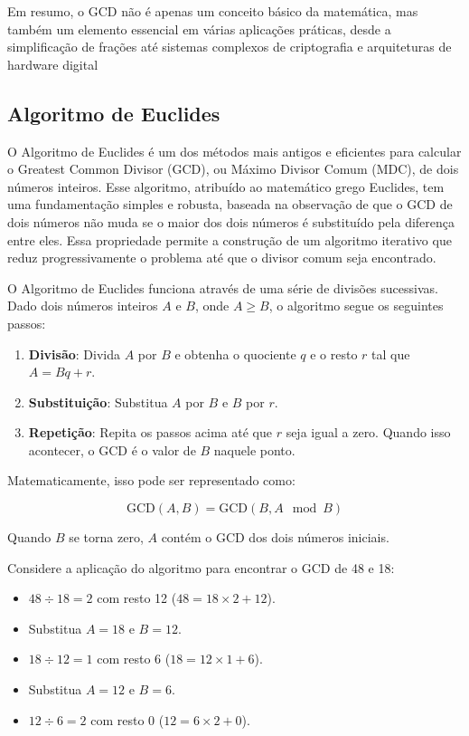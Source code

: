 \documentclass[a4paper,11pt]{article} %
\begin{document}
Em resumo, o GCD não é apenas um conceito básico da matemática, mas também um elemento essencial em várias aplicações práticas, desde a simplificação de frações até sistemas complexos de criptografia e arquiteturas de hardware digital

\subsection{Algoritmo de Euclides}
O Algoritmo de Euclides é um dos métodos mais antigos e eficientes para calcular o Greatest Common Divisor (GCD), ou Máximo Divisor Comum (MDC), de dois números inteiros. Esse algoritmo, atribuído ao matemático grego Euclides, tem uma fundamentação simples e robusta, baseada na observação de que o GCD de dois números não muda se o maior dos dois números é substituído pela diferença entre eles. Essa propriedade permite a construção de um algoritmo iterativo que reduz progressivamente o problema até que o divisor comum seja encontrado.

O Algoritmo de Euclides funciona através de uma série de divisões sucessivas. Dado dois números inteiros \( A \) e \( B \), onde \( A \geq B \), o algoritmo segue os seguintes passos:

\begin{enumerate}
    \item \textbf{Divisão}: Divida \( A \) por \( B \) e obtenha o quociente \( q \) e o resto \( r \) tal que \( A = Bq + r \).
    \item \textbf{Substituição}: Substitua \( A \) por \( B \) e \( B \) por \( r \).
    \item \textbf{Repetição}: Repita os passos acima até que \( r \) seja igual a zero. Quando isso acontecer, o GCD é o valor de \( B \) naquele ponto.
\end{enumerate}

Matematicamente, isso pode ser representado como:

\[
    \text{GCD}(A, B) = \text{GCD}(B, A \mod B)
\]

Quando \( B \) se torna zero, \( A \) contém o GCD dos dois números iniciais.

Considere a aplicação do algoritmo para encontrar o GCD de 48 e 18:

\begin{itemize}
    \item \( 48 \div 18 = 2 \) com resto 12 (\( 48 = 18 \times 2 + 12 \)).
    \item Substitua \( A = 18 \) e \( B = 12 \).
    \item \( 18 \div 12 = 1 \) com resto 6 (\( 18 = 12 \times 1 + 6 \)).
    \item Substitua \( A = 12 \) e \( B = 6 \).
    \item \( 12 \div 6 = 2 \) com resto 0 (\( 12 = 6 \times 2 + 0 \)).
\end{itemize}
\end{document}
